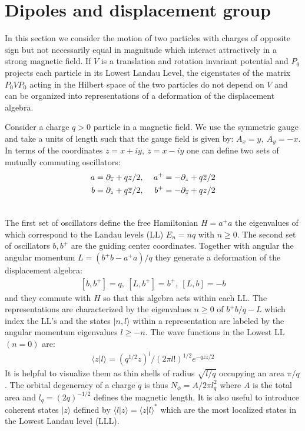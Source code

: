 \documentclass[a4paper,11pt]{article}
\newcommand{\zbar}{\overline z}
\newcommand{\del}{\partial}
\begin{document}
\section{Dipoles and displacement group}
\smallskip

In this section we consider the motion of two particles with
charges of opposite sign but not necessarily equal in magnitude
which interact attractively in a strong magnetic field.
If $V$ is a translation and rotation invariant
potential and $P_0$ projects
each particle in its Lowest Landau Level, 
the eigenstates of the matrix $P_0VP_0$ acting in the Hilbert space of the
two particles do not depend on $V$ and can be organized into
representations of a deformation of the displacement algebra.


Consider a charge $q>0$ particle in a magnetic field.
We use the symmetric gauge and take a units of length such
that the gauge field is given by: $A_x=y,\ A_y=-x$.
In terms of the  coordinates $z=x+iy, \ \overline z=x-iy$ 
one can define
two sets of mutually commuting oscillators:
\begin{eqnarray}
a=\del_{\zbar}+qz/2&,&\ a^+=-\del_{z} +q\zbar/2 \cr
b=\del_{z}+q\zbar/2&,&\ b^+=-\del_{\zbar} +qz/2 \cr
\nonumber
\end{eqnarray}

The first set of oscillators define the
free Hamiltonian $H=a^+a$ the  
eigenvalues of which correspond to the Landau levels (LL) $E_n=nq$ with $n\ge 0$. 
The
second set of oscillators $b,b^+$ are the guiding center coordinates. 
Together with angular the angular momentum $L=(b^+b-a^+a)/q$ 
they
generate a deformation of the
displacement algebra:
\begin{eqnarray}
\label{ALG}
[b,b^+]=q ,\
[L,b^+]=b^+ ,\
[L,b]=-b
\end{eqnarray}
and they commute with $H$ so that this algebra acts within each
LL. The representations are characterized by the eigenvalues $n \ge 0$ of
$b^+b/q-L$ which index the LL's and
the states $|n,l\rangle$ within a representation
are labeled by the angular momentum eigenvalues $l \ge -n$.
The wave functions in the Lowest LL $(n=0)$ are:
\begin{eqnarray}
\langle z|l\rangle=(q^{1/2}z)^l/(2\pi l!)^{1/2}e^{-qz\zbar/2}
\end{eqnarray}
It is helpful to visualize them as thin shells of radius $\sqrt{l/q}$
occupying an area $\pi/q$.  
The orbital degeneracy of a charge $q$ is thus $N_{\phi}=A/{2\pi l_q^2}$
where $A$ is the total area and $l_q=(2q)^{-1/2}$ defines the magnetic length.
It is also useful to introduce coherent states $|z\rangle$
defined by $\langle l|z\rangle=\langle z|l\rangle ^*$ which are the most localized states
in the Lowest Landau level (LLL).
\end{document}
